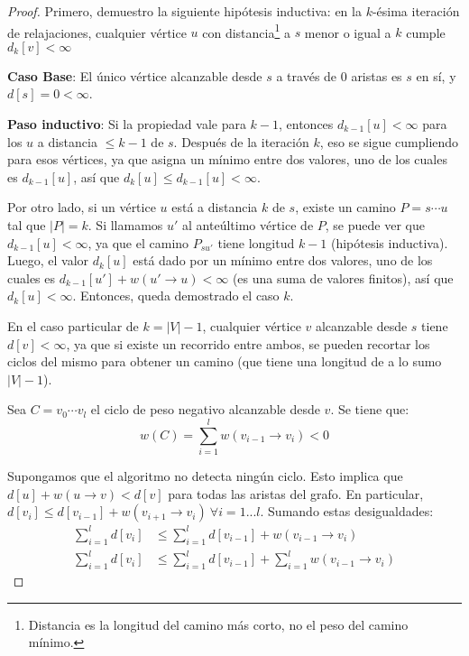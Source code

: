 \begin{proof}
    Primero, demuestro la siguiente hipótesis inductiva: en la $k$-ésima iteración de relajaciones, cualquier vértice $u$ con distancia\footnote{Distancia es la longitud del camino más corto, no el peso del camino mínimo.} a $s$ menor o igual a $k$ cumple $d_k[v] < \infty$

    \textbf{Caso Base}: El único vértice alcanzable desde $s$ a través de $0$ aristas es $s$ en sí, y $d[s] = 0 < \infty$.

    \textbf{Paso inductivo}: Si la propiedad vale para $k - 1$, entonces $d_{k - 1}[u] < \infty$ para los $u$ a distancia $\leq k - 1$ de $s$. Después de la iteración $k$, eso se sigue cumpliendo para esos vértices, ya que  asigna un mínimo entre dos valores, uno de los cuales es $d_{k - 1}[u]$, así que $d_k[u] \leq d_{k - 1}[u] < \infty$.

    Por otro lado, si un vértice $u$ está a distancia $k$ de $s$, existe un camino $P = s \cdots u$ tal que $|P| = k$. Si llamamos $u'$ al anteúltimo vértice de $P$, se puede ver que $d_{k - 1}[u] < \infty$, ya que el camino $P_{su'}$ tiene longitud $k - 1$ (hipótesis inductiva). Luego, el valor $d_k[u]$ está dado por un mínimo entre dos valores, uno de los cuales es $d_{k - 1}[u'] + w(u' \rightarrow u) < \infty$ (es una suma de valores finitos), así que $d_k[u] < \infty$. Entonces, queda demostrado el caso $k$.

    En el caso particular de $k = |V| - 1$, cualquier vértice $v$ alcanzable desde $s$ tiene $d[v] < \infty$, ya que si existe un recorrido entre ambos, se pueden recortar los ciclos del mismo para obtener un camino (que tiene una longitud de a lo sumo $|V| - 1$).

    Sea $C = v_0 \cdots v_l$ el ciclo de peso negativo alcanzable desde $v$. Se tiene que:
    $$w(C) = \sum_{i = 1}^l w(v_{i - 1} \rightarrow v_i) < 0$$

    Supongamos que el algoritmo no detecta ningún ciclo. Esto implica que $d[u] + w(u \rightarrow v) < d[v]$ para todas las aristas del grafo. En particular, $d[v_i] \leq d[v_{i - 1}] + w(v_{i + 1} \rightarrow v_i)\ \forall i = 1 ... l$. Sumando estas desigualdades:
    \begin{align*}
        \sum_{i = 1}^l d[v_i] & \leq \sum_{i = 1}^l d[v_{i - 1}] + w(v_{i - 1} \rightarrow v_i)                \\
        \sum_{i = 1}^l d[v_i] & \leq \sum_{i = 1}^l d[v_{i - 1}] + \sum_{i = 1}^l w(v_{i - 1} \rightarrow v_i)
    \end{align*}


\end{proof}
